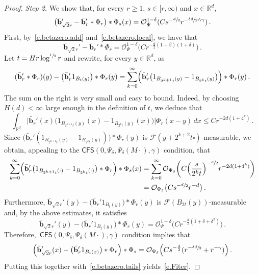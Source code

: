 \documentclass[11pt]{article} %
\let\oldsquare\square %
\renewcommand{\square}{\oldsquare}
\numberwithin{equation}{section}
\theoremstyle{definition}
\newcommand*{\R}{\ensuremath{\mathbb{R}}}
\newcommand{\bhom}{\bar{\mathbf{b}}}
\newcommand{\cu}{\square}
\newcommand{\F}{\mathcal{F}}
\renewcommand{\O}{\mathcal{O}}
\newcommand{\indc}{1}
\newcommand{\CFS}{\mathsf{CFS}}
\begin{document}
\begin{proof}
\emph{Step 2.} We show that, for every $r\geq 1$, $s \in [r,\infty)$ and $x \in \R^d$, 
\begin{equation}  \label{e.Fiter}
\bigl(  \bhom_{\sqrt{2} r}' - \bhom_{r}' \ast \Phi_{r} \bigr) \ast \Phi_{s}(x) 
= 
\O_\Psi^{1-\delta}(C s^{-\sfrac d2} r^{-\sfrac{ \delta d}2 \wedge \gamma}) \,.
\end{equation}
First, by~\eqref{e.betazero.add} and~\eqref{e.betazero.local}, we have that 
\begin{equation*}  
\bhom_{\sqrt{2} r}' - \bhom_{r}' \ast \Phi_{r} = \O_{\Psi}^{1-\delta}  \bigl(C r^{-\frac{d}{2}(1-\beta)(1+\delta)} \bigr) \,.
\end{equation*}
Let $t = H r \log^{\sfrac 12} r$ and rewrite, for every $y\in \R^d$, as 
\begin{equation*}  
(\bhom_{r}' \ast \Phi_{r})(y)  
- 
\bigl( \bhom_{r}' \indc_{B_{t}(y) } \bigr) \ast \Phi_{r}(y) 
= \sum_{k=0}^\infty \Bigl( \bhom_{r}' \bigl( \indc_{B_{2^{k+1} t}(y)}  - \indc_{B_{2^{k} t}(y)} \bigr)\Bigr)   \ast  \Phi_{r} (y)
\,.
\end{equation*}
The sum on the right is very small and easy to bound. Indeed, by choosing $H(d)<\infty$ large enough in the definition of $t$, we deduce that
\begin{equation*}  
\int_{\R^d} \Big| \bhom_{r}'(x) \bigl( \indc_{B_{2^{k+1} t}(y)}(x)  - \indc_{B_{2^{k} t}(y)}(x) \bigr) \Big|  \Phi_{r}(x-y) \, dx
\leq C r^{- 2d (1+4^k)}
 \,.
\end{equation*}
Since $\bigl( \bhom_{r}' ( \indc_{B_{2^{k+1} t}(y)}  - \indc_{B_{2^{k} t}(y)} ) \bigr) \ast \Phi_{r}(y)$ is $\F(y+ 2^{k+2} t \cu)$-measurable, we obtain, appealing to the $\CFS(0,\Psi_\delta,\Psi_\delta(M\cdot),\gamma)$ condition, that 
\begin{align}  \label{e.betazero.tails}
\notag
\sum_{k=0}^\infty \Bigl( \bhom_{r}' \bigl( \indc_{B_{2^{k+1} t}(\cdot)}  - \indc_{B_{2^{k} t}(\cdot)} \bigr)  \ast  \Phi_{r} \Bigr) \ast \Phi_s(x)
& 
=
\sum_{k=0}^\infty  \O_{\Psi_\delta} \biggl( C \Bigr( \frac{s}{2^k t}\Bigr)^{-\sfrac{d}{2}}  r^{- 2d (1+4^k)} \biggr)
\\ &
= 
 \O_{\Psi_\delta} \bigl( C s^{-\sfrac{d}{2}} r^{-d} \bigr)
\,.
\end{align}
Furthermore, $\bhom_{\sqrt{2} r}'(y)  -  \bigl( \bhom_{r}' \indc_{B_{t}(y) } \bigr) \ast \Phi_{r}(y)$ is $\F(B_{2t}(y))$-measurable and, by the above estimates, it satisfies
\begin{equation*}  
\bhom_{\sqrt{2} r}'(y)  -  \bigl( \bhom_{r}' \indc_{B_{t}(y) } \bigr) \ast \Phi_{r}(y) 
=
\O_{\Psi}^{1-\delta}  \bigl(C r^{-\frac{d}{2}(1+\delta+\delta^2)} \bigr)\,.
\end{equation*}
Therefore,~$\CFS(0,\Psi_\delta,\Psi_\delta(M\cdot),\gamma)$ condition implies that 
\begin{equation*}  
\Bigl( \bhom_{\sqrt{2} r}'(x) -   \bigl( \bhom_{r}' \indc_{B_{t}(x) }  \bigr) \ast \Phi_{r} \Bigr) \ast \Phi_s 
= 
 \O_{\Psi_\delta} \Bigl(C s^{-\frac{d}{2}} ( r^{-\sfrac{\delta d}{2}}+ r^{-\gamma} ) \Bigr) 
 \,.
\end{equation*}
Putting this together with~\eqref{e.betazero.tails} yields~\eqref{e.Fiter}. 


\end{proof}
\end{document}
